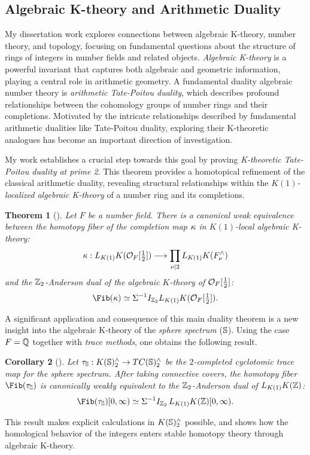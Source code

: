 \documentclass[11pt]{article}
\newtheorem{theorem}{Theorem}
\newtheorem{corollary}[theorem]{Corollary}
\begin{document}
\subsection{Algebraic K-theory and Arithmetic Duality}
My dissertation work explores connections between algebraic K-theory, number theory, and topology, focusing on fundamental questions about the structure of rings of integers in number fields and related objects. {\it Algebraic K-theory} is a powerful invariant that captures both algebraic and geometric information, playing a central role in arithmetic geometry. A fundamental duality algebraic number theory is {\it arithmetic Tate-Poitou duality}, which describes profound relationships between the cohomology groups of number rings and their completions. Motivated by the intricate relationships described by fundamental arithmetic dualities like Tate-Poitou duality, exploring their K-theoretic analogues has become an important direction of investigation.

My work establishes a crucial step towards this goal by proving {\it K-theoretic Tate-Poitou duality at prime 2}. This theorem provides a homotopical refinement of the classical arithmetic duality, revealing structural relationships within the {\it $K(1)$-localized algebraic K-theory} of a number ring and its completions.
\begin{theorem}[\cite{Cho}]
Let $F$ be a number field.
There is a canonical weak equivalence between  the {\it homotopy fiber of the completion map} $\kappa$ in $K(1)$-local algebraic K-theory:
\[\kappa: L_{K(1)}K({\mathcal{O}}_F[\tfrac{1}{2}]) \longrightarrow \prod_{\nu \mid 2} L_{K(1)}K(F_\nu^\wedge)\]
and the $\mathbb{Z}_2$-Anderson dual of the algebraic $K$-theory of ${\mathcal{O}}_F[\tfrac{1}{2}]$:
 \begin{equation}\label{fib}
 \Fib(\ka) \simeq \SI^{-1} I_{\bZ_2} L_{K(1)}K(\calO_F[\tfrac{1}{2}]).
\end{equation}
\end{theorem}

A significant application and consequence of this main duality theorem is a new insight into the algebraic K-theory of the {\it sphere spectrum} ($\mathbb{S}$).
Using the case $F=\mathbb{Q}$ together with {\it trace methods}, one obtains the following result.
\begin{corollary}[\cite{Cho}]
Let $\tau_{\mathbb{S}}: K(\mathbb{S})_2^\wedge \to TC(\mathbb{S})_2^\wedge$ be the $2$-completed cyclotomic trace map for the sphere spectrum.
After taking connective covers, the homotopy fiber $\Fib(\ta_\bS)$ is canonically weakly equivalent to the $\mathbb{Z}_2$-Anderson dual of $L_{K(1)}K(\mathbb{Z})$:
\[\Fib(\ta_\bS)[0,\infty) \simeq \Sigma^{-1} I_{\bZ_2}\, L_{K(1)}K(\bZ)[0,\infty).\]
\end{corollary}
This result makes explicit calculations in $K(\mathbb{S})_2^\wedge$ possible, and shows how the homological behavior of the integers enters stable homotopy theory through algebraic K-theory.
\end{document}
